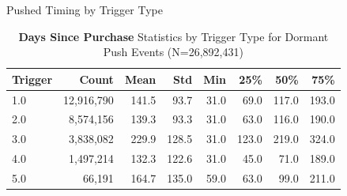 \documentclass[aspectratio=169]{beamer}  %
\begin{document}
\begin{frame}{Pushed Timing by Trigger Type}
\begin{table}[h]
\centering
\caption{\textbf{Days Since Purchase} Statistics by Trigger Type for Dormant Push Events (N=26,892,431)}
\label{tab:trigger_stats}
\small
\begin{tabular}{lrrrrrrr}
\toprule
\textbf{Trigger} & \textbf{Count} & \textbf{Mean} & \textbf{Std} & \textbf{Min} & \textbf{25\%} & \textbf{50\%} & \textbf{75\%} \\
\midrule
1.0 & 12,916,790 & 141.5 & 93.7 & 31.0 & 69.0 & 117.0 & 193.0 \\
2.0 & 8,574,156 & 139.3 & 93.3 & 31.0 & 63.0 & 116.0 & 190.0 \\
3.0 & 3,838,082 & 229.9 & 128.5 & 31.0 & 123.0 & 219.0 & 324.0 \\
4.0 & 1,497,214 & 132.3 & 122.6 & 31.0 & 45.0 & 71.0 & 189.0 \\
5.0 & 66,191 & 164.7 & 135.0 & 59.0 & 63.0 & 99.0 & 211.0 \\
\bottomrule
\end{tabular}
\end{table}
\end{frame}
\end{document}
